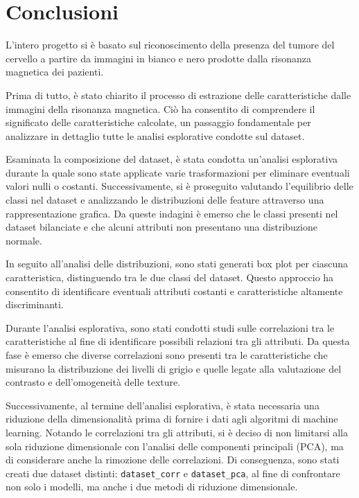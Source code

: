 \chapter{Conclusioni}
L'intero progetto si è basato sul riconoscimento della presenza del tumore del
cervello a partire da immagini in bianco e nero prodotte dalla risonanza
magnetica dei pazienti.

Prima di tutto, è stato chiarito il processo di estrazione delle caratteristiche
dalle immagini della risonanza magnetica. Ciò ha consentito di comprendere il
significato delle caratteristiche calcolate, un passaggio fondamentale per
analizzare in dettaglio tutte le analisi esplorative condotte sul dataset.

Esaminata la composizione del dataset, è stata condotta un'analisi esplorativa
durante la quale sono state applicate varie trasformazioni per eliminare
eventuali valori nulli o costanti. Successivamente, si è proseguito valutando
l'equilibrio delle classi nel dataset e analizzando le distribuzioni delle
feature attraverso una rappresentazione grafica. Da queste indagini è emerso che
le classi presenti nel dataset bilanciate e che alcuni attributi non presentano
una distribuzione normale.

In seguito all'analisi delle distribuzioni, sono stati generati box plot per
ciascuna caratteristica, distinguendo tra le due classi del dataset. Questo
approccio ha consentito di identificare eventuali attributi costanti e
caratteristiche altamente discriminanti.

Durante l'analisi esplorativa, sono stati condotti studi sulle correlazioni tra
le caratteristiche al fine di identificare possibili relazioni tra gli attributi.
Da questa fase è emerso che diverse correlazioni sono presenti tra le
caratteristiche che misurano la distribuzione dei livelli di grigio e quelle
legate alla valutazione del contrasto e dell'omogeneità delle texture.

Successivamente, al termine dell'analisi esplorativa, è stata necessaria una
riduzione della dimensionalità prima di fornire i dati agli algoritmi di machine
learning. Notando le correlazioni tra gli attributi, si è deciso di non limitarsi
alla sola riduzione dimensionale con l'analisi delle componenti principali (PCA),
ma di considerare anche la rimozione delle correlazioni. Di conseguenza, sono
stati creati due dataset distinti: \texttt{dataset\_corr} e \texttt{dataset\_pca},
al fine di confrontare non solo i modelli, ma anche i due metodi di riduzione
dimensionale.

